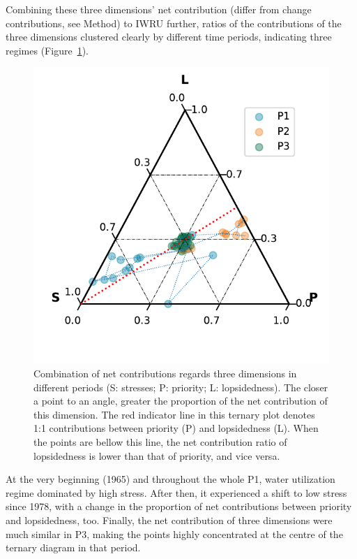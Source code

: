 \documentclass[9pt, twocolumn, twoside, lineno]{pnas-new}
\begin{document}
Combining these three dimensions' net contribution (differ from change contributions, see Method) to IWRU further, ratios of the contributions of the three dimensions clustered clearly by different time periods, indicating three regimes (Figure~\ref{fig:phases}).
\begin{figure}%
	\centering
	\includegraphics[width=\linewidth]{../../figures/main/phases.pdf}
	\caption{Combination of net contributions regards three dimensions in different periods (S: stresses; P: priority; L: lopsidedness). The closer a point to an angle, greater the proportion of the net contribution of this dimension.
	The red indicator line in this ternary plot denotes 1:1 contributions between priority (P) and lopsidedness (L). When the points are bellow this line, the net contribution ratio of lopsidedness is lower than that of priority, and vice versa.}
	\label{fig:phases}
\end{figure}
At the very beginning (1965) and throughout the whole P1, water utilization regime dominated by high stress. After then, it experienced a shift to low stress since 1978, with a change in the proportion of net contributions between priority and lopsidedness, too.
Finally, the net contribution of three dimensions were much similar in P3, making the points highly concentrated at the centre of the ternary diagram in that period.
\end{document}

